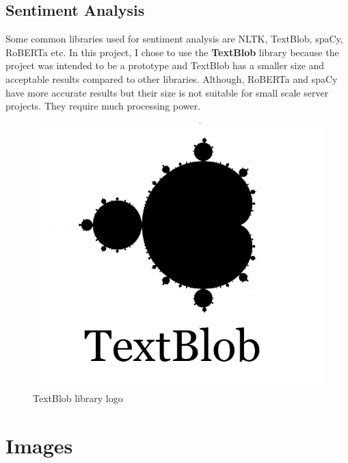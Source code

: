 \subsection{Sentiment Analysis}
Some common libraries used for sentiment analysis are 
NLTK, TextBlob, spaCy, RoBERTa etc. 
In this project, I chose to use the \textbf{TextBlob} library because
the project was intended to be a prototype and TextBlob has a smaller
size and acceptable results compared to other libraries.
Although, RoBERTa and spaCy have more accurate results but their size
is not suitable for small scale server projects. They require much
processing power.
\begin{figure}[h]
	\begin{center}
		\includegraphics[width=.5\textwidth]{textblob.png}
	\end{center}
	\caption{TextBlob library logo}\label{fig: Textblob library logo}
\end{figure}


\section{Images}


